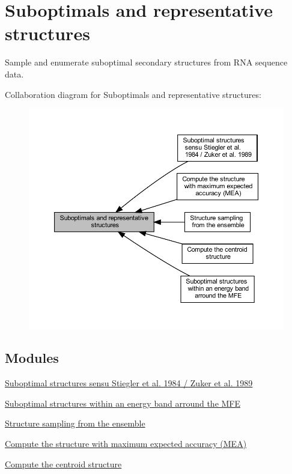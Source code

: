 \hypertarget{group__subopt__and__representatives}{}\section{Suboptimals and representative structures}
\label{group__subopt__and__representatives}


Sample and enumerate suboptimal secondary structures from R\+NA sequence data.  


Collaboration diagram for Suboptimals and representative structures\+:
\nopagebreak
\begin{figure}[H]
\begin{center}
\leavevmode
\includegraphics[width=350pt]{group__subopt__and__representatives}
\end{center}
\end{figure}
\subsection*{Modules}
\begin{DoxyCompactItemize}
\item 
\hyperlink{group__subopt__zuker}{Suboptimal structures sensu Stiegler et al. 1984 / Zuker et al. 1989}
\item 
\hyperlink{group__subopt__wuchty}{Suboptimal structures within an energy band arround the M\+FE}
\item 
\hyperlink{group__subopt__stochbt}{Structure sampling from the ensemble}
\item 
\hyperlink{group__mea__fold}{Compute the structure with maximum expected accuracy (\+M\+E\+A)}
\item 
\hyperlink{group__centroid__fold}{Compute the centroid structure}
\end{DoxyCompactItemize}
